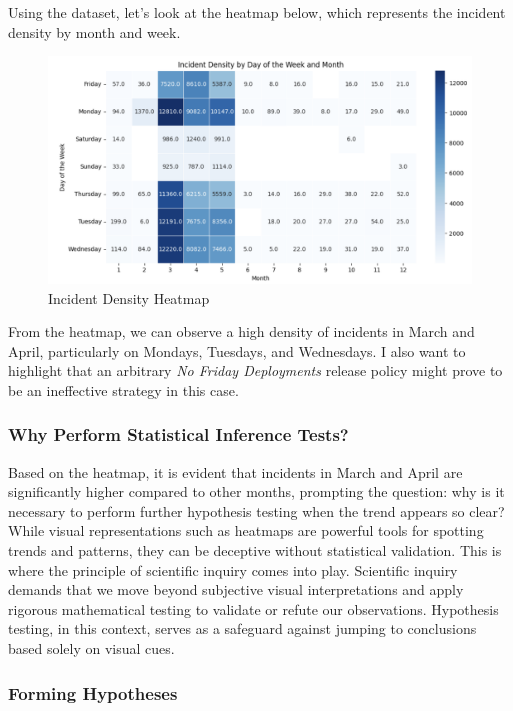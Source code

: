 \documentclass{article}
\begin{document}
Using the dataset, let's look at the heatmap below, which represents the incident density by month and week. 

\begin{figure}[H]
    \centering
    \includegraphics[width=0.7\linewidth]{resources/Screenshot 2024-10-01 233549.png}
    \caption{Incident Density Heatmap}
    \label{fig:enter-label}
\end{figure}

From the heatmap, we can observe a high density of incidents in March and April, particularly on Mondays, Tuesdays, and Wednesdays. I also want to highlight that an arbitrary \textit{No Friday Deployments} release policy might prove to be an ineffective strategy in this case. 

\subsubsection{Why Perform Statistical Inference Tests?}

Based on the heatmap, it is evident that incidents in March and April are significantly higher compared to other months, prompting the question: why is it necessary to perform further hypothesis testing when the trend appears so clear? While visual representations such as heatmaps are powerful tools for spotting trends and patterns, they can be deceptive without statistical validation. This is where the principle of scientific inquiry comes into play. Scientific inquiry demands that we move beyond subjective visual interpretations and apply rigorous mathematical testing to validate or refute our observations. Hypothesis testing, in this context, serves as a safeguard against jumping to conclusions based solely on visual cues.

\subsubsection{Forming Hypotheses}
\end{document}
